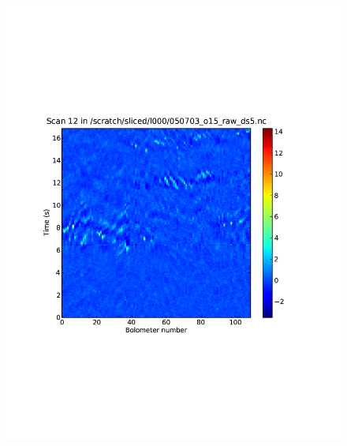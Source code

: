 \setcounter{subfig}{1}
\begin{figure}
  \begin{minipage}{3.25in}
    \begin{center}
      \includegraphics[scale=0.5]{flagger_withglitch}
    \end{center}
  \end{minipage}
  \begin{minipage}{3.25in}
    \begin{center}

\end{center}
\end{minipage}
\end{figure}
